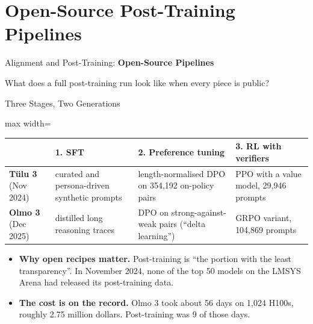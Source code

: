 \section{Open-Source Post-Training Pipelines}

\begin{frame}{}
    \LARGE Alignment and Post-Training: \textbf{Open-Source Pipelines}

    \vspace{1em}
    \normalsize What does a full post-training run look like when every piece is public?
\end{frame}

\begin{frame}{Three Stages, Two Generations}
    \begin{center}
    \small
    \renewcommand{\arraystretch}{1.1}
    \begin{adjustbox}{max width=\linewidth}\begin{tabular}{l>{\raggedright\arraybackslash}p{3.1cm}>{\raggedright\arraybackslash}p{3.6cm}>{\raggedright\arraybackslash}p{3.3cm}}
        \toprule
        & \cellcolor{gray!12}\textbf{1. SFT} & \cellcolor{KAUSTcyan!15}\textbf{2. Preference tuning} & \cellcolor{darkorange!20}\textbf{3. RL with verifiers} \\
        \midrule
        \textbf{T\"ulu 3} (Nov 2024) & curated and persona-driven synthetic prompts & length-normalised DPO on 354,192 on-policy pairs & PPO with a value model, 29,946 prompts \\
        \textbf{Olmo 3} (Dec 2025) & distilled long reasoning traces & DPO on strong-against-weak pairs (``delta learning'') & GRPO variant, 104,869 prompts \\
        \bottomrule
    \end{tabular}\end{adjustbox}
    \end{center}
    \begin{itemize}\itemsep0.45em
        \item \textbf{Why open recipes matter.} Post-training is ``the portion with the least transparency''. In November 2024, none of the top 50 models on the LMSYS Arena had released its post-training data.
        \item \textbf{The cost is on the record.} Olmo 3 took about 56 days on 1,024 H100s, roughly 2.75 million dollars. Post-training was 9 of those days.
    \end{itemize}
\end{frame}

